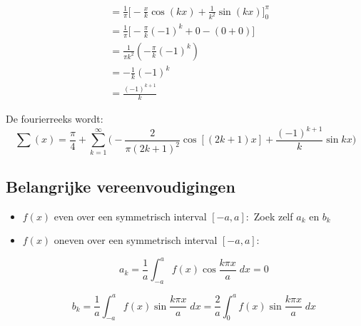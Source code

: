 {\begin{itemize}[label={}]
\begin{equation*}
\begin{split}
					      & = \frac{1}{\pi} \bigg[-\frac{x}{k}\cos(kx) + \frac{1}{k^2}\sin(kx)\bigg]_{0}^{\pi} \\
					      & = \frac{1}{\pi} \bigg[-\frac{\pi}{k}(-1)^k + 0 - ( 0 + 0)\bigg] \\
					      & = \frac{1}{\pi k^2}(-\frac{\pi}{k}(-1)^k) \\
					      & = -\frac{1}{k}(-1)^k \\
					      & = \frac{(-1)^{k + 1}}{k}
				      \end{split}
			      \end{equation*}
		\end{itemize}
		De fourierreeks wordt:
		$$\sum (x) = \frac{\pi}{4} + \sum_{k = 1}^{\infty} \bigg(-\frac{2}{\pi(2k + 1)^2}\cos[(2k + 1)x]  + \frac{(-1)^{k + 1}}{k}\sin kx\bigg)$$
	}

	\subsection{Belangrijke vereenvoudigingen}
	\begin{itemize}
		\item $f(x)$ even over een symmetrisch interval $[-a, a]:$
		      Zoek zelf $a_k$ en $b_k$
		\item $f(x)$ oneven over een symmetrisch interval $[-a, a]:$

		      $$a_k = \frac{1}{a}\int_{-a}^{a} f(x) \cos \frac{k\pi x}{a}\;dx = 0$$

		      $$b_k = \frac{1}{a}\int_{-a}^{a} f(x) \sin \frac{k\pi x}{a}\;dx = \frac{2}{a}\int_{0}^{a} f(x) \sin \frac{k\pi x}{a}\;dx $$

	\end{itemize}


